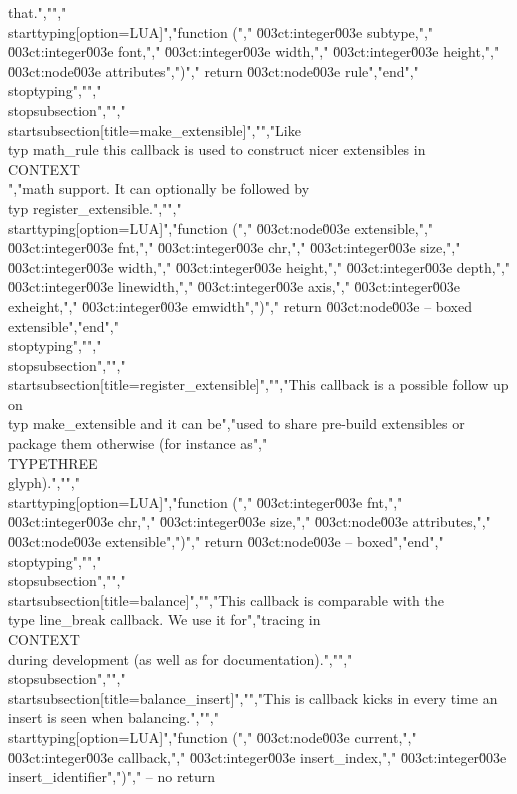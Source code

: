 that.","","\\starttyping[option=LUA]","function (","    \u003ct:integer\u003e subtype,","    \u003ct:integer\u003e font,","    \u003ct:integer\u003e width,","    \u003ct:integer\u003e height,","    \u003ct:node\u003e    attributes",")","    return \u003ct:node\u003e rule","end","\\stoptyping","","\\stopsubsection","","\\startsubsection[title=make_extensible]","","Like \\typ {math_rule} this callback is used to construct nicer extensibles in \\CONTEXT\\","math support. It can optionally be followed by \\typ {register_extensible}.","","\\starttyping[option=LUA]","function (","    \u003ct:node\u003e    extensible,","    \u003ct:integer\u003e fnt,","    \u003ct:integer\u003e chr,","    \u003ct:integer\u003e size,","    \u003ct:integer\u003e width,","    \u003ct:integer\u003e height,","    \u003ct:integer\u003e depth,","    \u003ct:integer\u003e linewidth,","    \u003ct:integer\u003e axis,","    \u003ct:integer\u003e exheight,","    \u003ct:integer\u003e emwidth",")","    return \u003ct:node\u003e -- boxed extensible","end","\\stoptyping","","\\stopsubsection","","\\startsubsection[title=register_extensible]","","This callback is a possible follow up on \\typ {make_extensible} and it can be","used to share pre-build extensibles or package them otherwise (for instance as","\\TYPETHREE\\ glyph).","","\\starttyping[option=LUA]","function (","    \u003ct:integer\u003e fnt,","    \u003ct:integer\u003e chr,","    \u003ct:integer\u003e size,","    \u003ct:node\u003e    attributes,","    \u003ct:node\u003e    extensible",")","    return \u003ct:node\u003e -- boxed","end","\\stoptyping","","\\stopsubsection","","\\startsubsection[title=balance]","","This callback is comparable with the \\type {line_break} callback. We use it for","tracing in \\CONTEXT\\ during development (as well as for documentation).","","\\stopsubsection","","\\startsubsection[title=balance_insert]","","This is callback kicks in every time an insert is seen when balancing.","","\\starttyping[option=LUA]","function (","    \u003ct:node\u003e    current,","    \u003ct:integer\u003e callback,","    \u003ct:integer\u003e insert_index,","    \u003ct:integer\u003e insert_identifier",")","    -- no return 